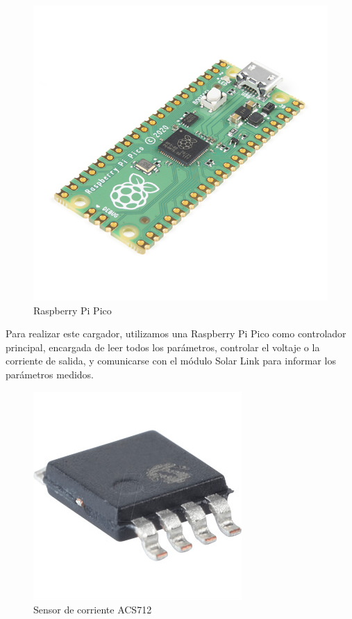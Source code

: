 \begin{figure}
\includegraphics[width=0.9\linewidth]{MPPT/17829-Raspberry_Pi_Pico-01.jpg} 
\caption{Raspberry Pi Pico}
\label{fig:wrapfig}
\end{figure}

Para realizar este cargador, utilizamos una Raspberry Pi Pico como controlador principal, encargada de leer todos los parámetros, controlar el voltaje o la corriente de salida, y comunicarse con el módulo Solar Link para informar los parámetros medidos.\\

\begin{figure}
\includegraphics[width=0.9\linewidth]{MPPT/acs712.jpg} 
\caption{Sensor de corriente ACS712}
\label{fig:wrapfig}
\end{figure}

